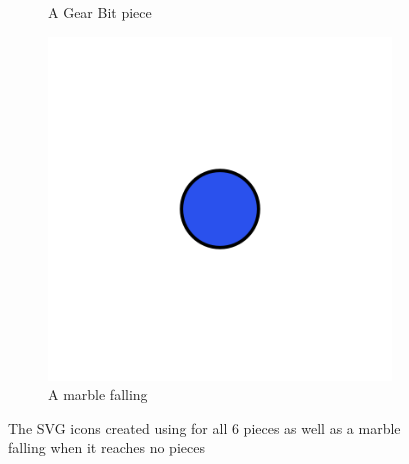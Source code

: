 \documentclass{l4proj}
\begin{document}
\begin{figure}
\begin{subfigure}[b]{0.20\textwidth}
        \caption{A Gear Bit piece \\}
        \label{fig:gearbit}
    \end{subfigure}
    \begin{subfigure}[b]{0.20\textwidth}
        \includegraphics[width=\textwidth]{images/blue-marble-fall.png}
        \caption{A marble falling \\}
        \label{fig:marbleFall}
    \end{subfigure}
    \caption{The SVG icons created using \cite{noauthor_method_nodate} for all 6 pieces as well as a marble falling when it reaches no pieces}
    \label{fig:pieces}
\end{figure}
\end{document}
